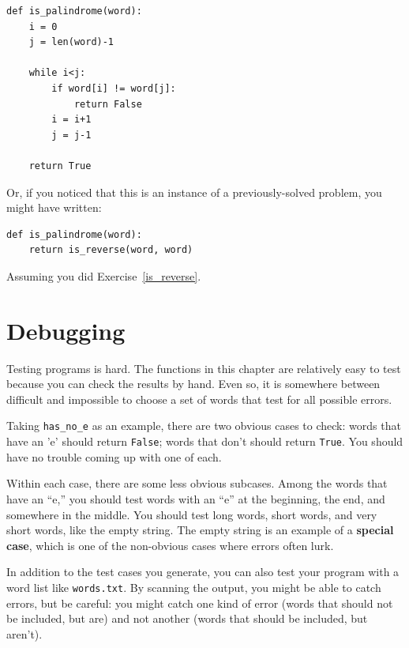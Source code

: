 \documentclass[10pt]{book}
\begin{document}
\beforeverb
\begin{verbatim}
def is_palindrome(word):
    i = 0
    j = len(word)-1

    while i<j:
        if word[i] != word[j]:
            return False
        i = i+1
        j = j-1

    return True
\end{verbatim}
\afterverb

Or, if you noticed that this is an instance of a previously-solved
problem, you might have written:

\beforeverb
\begin{verbatim}
def is_palindrome(word):
    return is_reverse(word, word)
\end{verbatim}
\afterverb


Assuming you did Exercise~\ref{is_reverse}.


\section{Debugging}


Testing programs is hard.  The functions in this chapter are
relatively easy to test because you can check the results by hand.
Even so, it is somewhere between difficult and impossible to choose a
set of words that test for all possible errors.

Taking \verb"has_no_e" as an example, there are two obvious
cases to check: words that have an 'e' should return {\tt False};
words that don't should return {\tt True}.  You should have no
trouble coming up with one of each.

Within each case, there are some less obvious subcases.  Among the
words that have an ``e,'' you should test words with an ``e'' at the
beginning, the end, and somewhere in the middle.  You should test long
words, short words, and very short words, like the empty string.  The
empty string is an example of a {\bf special case}, which is one of
the non-obvious cases where errors often lurk.


In addition to the test cases you generate, you can also test
your program with a word list like {\tt words.txt}.  By scanning
the output, you might be able to catch errors, but be careful:
you might catch one kind of error (words that should not be
included, but are) and not another (words that should be included,
but aren't).
\end{document}
